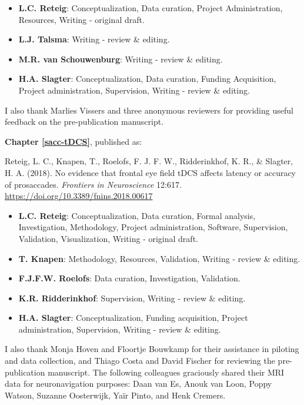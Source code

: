 \documentclass[11pt,]{memoir}
\providecommand{\tightlist}{%
  \setlength{\itemsep}{0pt}\setlength{\parskip}{0pt}}
\begin{document}
\begin{itemize}
\tightlist
\item
  \textbf{L.C. Reteig}: Conceptualization, Data curation, Project Administration, Resources, Writing - original draft.
\item
  \textbf{L.J. Talsma}: Writing - review \& editing.
\item
  \textbf{M.R. van Schouwenburg}: Writing - review \& editing.
\item
  \textbf{H.A. Slagter}: Conceptualization, Data curation, Funding Acquisition, Project administration, Supervision, Writing - review \& editing.
\end{itemize}

\begin{list}{}{\leftmargin=1.5em\rightmargin=0pt}
\item
I also thank Marlies Vissers and three anonymous reviewers for providing useful feedback on the pre-publication manuscript.
\end{list}

\textbf{Chapter \ref{sacc-tDCS}}, published as:

Reteig, L. C., Knapen, T., Roelofs, F. J. F. W., Ridderinkhof, K. R., \& Slagter, H. A. (2018). No evidence that frontal eye field tDCS affects latency or accuracy of prosaccades. \emph{Frontiers in Neuroscience} 12:617. \url{https://doi.org/10.3389/fnins.2018.00617}

\begin{itemize}
\tightlist
\item
  \textbf{L.C. Reteig}: Conceptualization, Data curation, Formal analysis, Investigation, Methodology, Project administration, Software, Supervision, Validation, Visualization, Writing - original draft.
\item
  \textbf{T. Knapen}: Methodology, Resources, Validation, Writing - review \& editing.
\item
  \textbf{F.J.F.W. Roelofs}: Data curation, Investigation, Validation.
\item
  \textbf{K.R. Ridderinkhof}: Supervision, Writing - review \& editing.
\item
  \textbf{H.A. Slagter}: Conceptualization, Funding acquisition, Project administration, Supervision, Writing - review \& editing.
\end{itemize}

\begin{list}{}{\leftmargin=1.5em\rightmargin=0pt}
\item
I also thank Monja Hoven and Floortje Bouwkamp for their assistance in piloting and data collection, and Thiago Costa and David Fischer for reviewing the pre-publication manuscript. The following colleagues graciously shared their MRI data for neuronavigation purposes: Daan van Es, Anouk van Loon, Poppy Watson, Suzanne Oosterwijk, Yaïr Pinto, and Henk Cremers.
\end{list}
\end{document}
